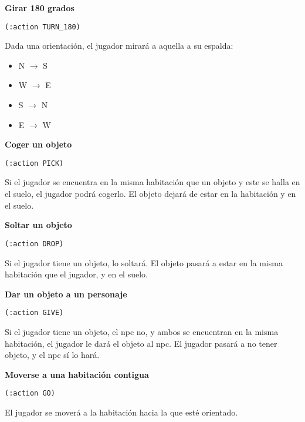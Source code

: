 \documentclass[11pt,a4paper]{article}
\begin{document}
\medskip

\large{\textbf{Girar 180 grados}}

\texttt{(:action TURN\_180)}

\smallskip

Dada una orientación, el jugador mirará a aquella a su espalda:

\begin{itemize}
\item N $\rightarrow$ S
\item W $\rightarrow$ E
\item S $\rightarrow$ N
\item E $\rightarrow$ W
\end{itemize}

\medskip

\large{\textbf{Coger un objeto}}

\texttt{(:action PICK)}

\smallskip

Si el jugador se encuentra en la misma habitación que un objeto y este se halla en el suelo,
el jugador podrá cogerlo. El objeto dejará de estar en la habitación y en el suelo.

\medskip

\large{\textbf{Soltar un objeto}}

\texttt{(:action DROP)}

\smallskip

Si el jugador tiene un objeto, lo soltará. El objeto pasará a estar en la misma habitación que el jugador,
y en el suelo.

\medskip

\large{\textbf{Dar un objeto a un personaje}}

\texttt{(:action GIVE)}

\smallskip

Si el jugador tiene un objeto, el npc no, y ambos se encuentran en la misma habitación, el jugador le dará 
el objeto al npc. El jugador pasará a no tener objeto, y el npc sí lo hará. 

\medskip
\large{\textbf{Moverse a una habitación contigua}}

\texttt{(:action GO)}

\smallskip

El jugador se moverá a la habitación hacia la que esté orientado.

\medskip
\end{document}
